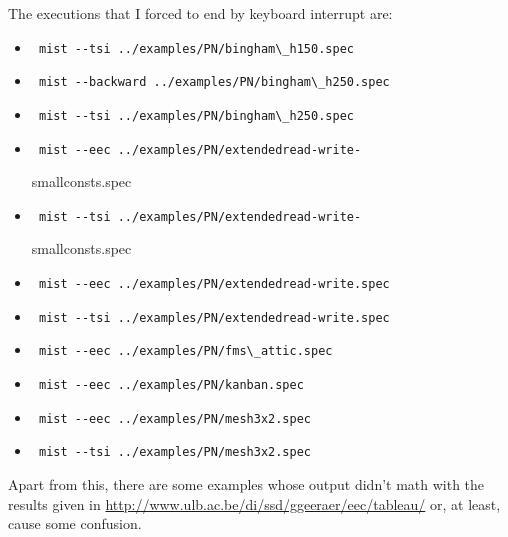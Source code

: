 \documentclass[nochap]{apuntes}
\begin{document}
The executions that I forced to end by keyboard interrupt are:
\begin{itemize}
\item \begin{verbatim} mist --tsi ../examples/PN/bingham\_h150.spec \end{verbatim}
\item \begin{verbatim} mist --backward ../examples/PN/bingham\_h250.spec \end{verbatim}
\item \begin{verbatim} mist --tsi ../examples/PN/bingham\_h250.spec \end{verbatim}
\item \begin{verbatim} mist --eec ../examples/PN/extendedread-write- \end{verbatim}smallconsts.spec
\item \begin{verbatim} mist --tsi ../examples/PN/extendedread-write- \end{verbatim}smallconsts.spec
\item \begin{verbatim} mist --eec ../examples/PN/extendedread-write.spec \end{verbatim}
\item \begin{verbatim} mist --tsi ../examples/PN/extendedread-write.spec \end{verbatim}
\item \begin{verbatim} mist --eec ../examples/PN/fms\_attic.spec \end{verbatim}
\item \begin{verbatim} mist --eec ../examples/PN/kanban.spec \end{verbatim}
\item \begin{verbatim} mist --eec ../examples/PN/mesh3x2.spec \end{verbatim}
\item \begin{verbatim} mist --tsi ../examples/PN/mesh3x2.spec \end{verbatim}
\end{itemize}

Apart from this, there are some examples whose output didn't math with the results given in \url{http://www.ulb.ac.be/di/ssd/ggeeraer/eec/tableau/} or, at least, cause some confusion.
\end{document}
